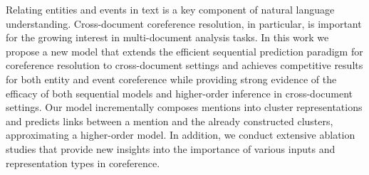 Relating entities and events in text is a key component of natural language understanding. Cross-document coreference resolution, in particular, is important for the growing interest in multi-document analysis tasks. In this work we propose a new model that extends the efficient sequential prediction paradigm for coreference resolution to cross-document settings and achieves competitive results for both entity and event coreference while providing strong evidence of the efficacy of both sequential models and higher-order inference in cross-document settings. Our model incrementally composes mentions into cluster representations and predicts links between a mention and the already constructed clusters, approximating a higher-order model. In addition, we conduct extensive ablation studies that provide new insights into the importance of various inputs and representation types in coreference.
